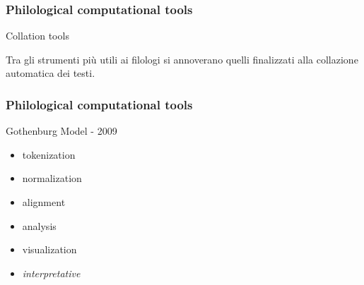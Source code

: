 \begin{frame}
	\frametitle{Philological computational tools}
	\addtocounter{nframe}{1}
    \begin{block}{Collation tools}
            
        \begin{center}
            Tra gli strumenti più utili ai filologi si annoverano quelli finalizzati alla collazione automatica dei testi.

		\end{center}
    \end{block}
    
\end{frame}

\begin{frame}
	\frametitle{Philological computational tools}
	\addtocounter{nframe}{1}
        
    \begin{block}{Gothenburg Model - 2009}
            \begin{itemize}
                \item tokenization
                \item normalization
                \item alignment
                \item analysis
                \item visualization
                \item \textit{interpretative}
            \end{itemize}
    \end{block}
\end{frame}

